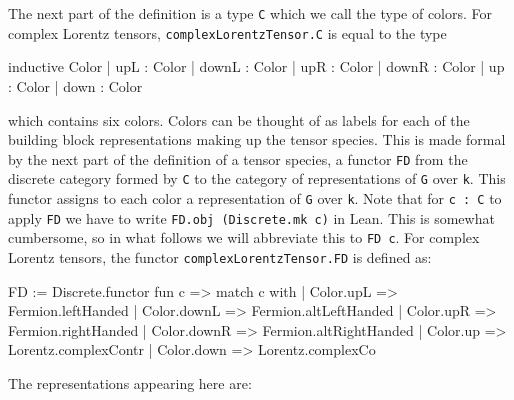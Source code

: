 \documentclass[a4paper, 11pt]{article}
\DeclareRobustCommand{\myinline}{\lstinline}
\begin{document}
The next part of the definition is a type \myinline|C| which we call the type of colors.
For complex Lorentz tensors, \myinline|complexLorentzTensor.C| is equal to the type
\begin{code}
inductive Color
  | upL : Color
  | downL : Color
  | upR : Color
  | downR : Color
  | up : Color
  | down : Color
\end{code}
which contains six colors.
Colors can be thought of as labels for each of the building 
block representations making up the tensor species.  This is made formal by the
next part of the definition of a tensor species, a functor 
\myinline|FD| from the discrete category formed by \myinline|C| to 
the category of representations of \myinline|G| over \myinline|k|. This functor assigns to each color a representation of \myinline|G| over \myinline|k|.
Note that for \myinline|c : C| to apply \myinline|FD| we have to write 
\myinline|FD.obj (Discrete.mk c)| in Lean. This is somewhat cumbersome, so in what 
follows we will abbreviate this to \myinline|FD c|.
For complex Lorentz tensors, the functor \myinline|complexLorentzTensor.FD| is defined as:
\begin{code}
FD := Discrete.functor fun c =>
  match c with
  | Color.upL => Fermion.leftHanded
  | Color.downL => Fermion.altLeftHanded
  | Color.upR => Fermion.rightHanded
  | Color.downR => Fermion.altRightHanded
  | Color.up => Lorentz.complexContr
  | Color.down => Lorentz.complexCo
\end{code}
The representations appearing here are: 
\end{document}
